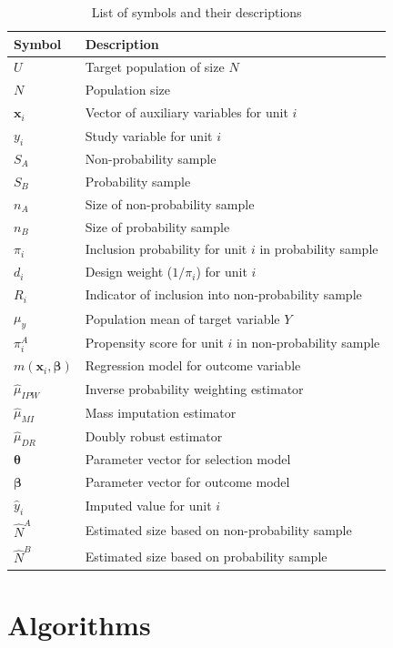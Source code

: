 \documentclass[
]{jss}
\begin{document}
\begin{table}[ht!]
\centering
\begin{tabular}{ll}
\hline
\textbf{Symbol} & \textbf{Description} \\
\hline
$U$ & Target population of size $N$ \\
$N$ & Population size \\
$\boldsymbol{x}_i$ & Vector of auxiliary variables for unit $i$ \\
$y_i$ & Study variable for unit $i$ \\
$S_A$ & Non-probability sample \\
$S_B$ & Probability sample \\
$n_A$ & Size of non-probability sample \\
$n_B$ & Size of probability sample \\
$\pi_i$ & Inclusion probability for unit $i$ in probability sample \\
$d_i$ & Design weight ($1/\pi_i$) for unit $i$ \\
$R_i$ & Indicator of inclusion into non-probability sample \\
$\mu_y$ & Population mean of target variable $Y$ \\
$\pi_i^A$ & Propensity score for unit $i$ in non-probability sample \\
$m(\boldsymbol{x}_i, \boldsymbol{\beta})$ & Regression model for outcome variable \\
$\hat{\mu}_{IPW}$ & Inverse probability weighting estimator \\
$\hat{\mu}_{MI}$ & Mass imputation estimator \\
$\hat{\mu}_{DR}$ & Doubly robust estimator \\
$\boldsymbol{\theta}$ & Parameter vector for selection model \\
$\boldsymbol{\beta}$ & Parameter vector for outcome model \\
$\hat{y}_i$ & Imputed value for unit $i$ \\
$\hat{N}^A$ & Estimated size based on non-probability sample \\
$\hat{N}^B$ & Estimated size based on probability sample \\
\hline
\end{tabular}
\caption{List of symbols and their descriptions}
\label{tab-list-of-sybmols}
\end{table}

\clearpage

\section{Algorithms}\label{sec-details}
\end{document}
